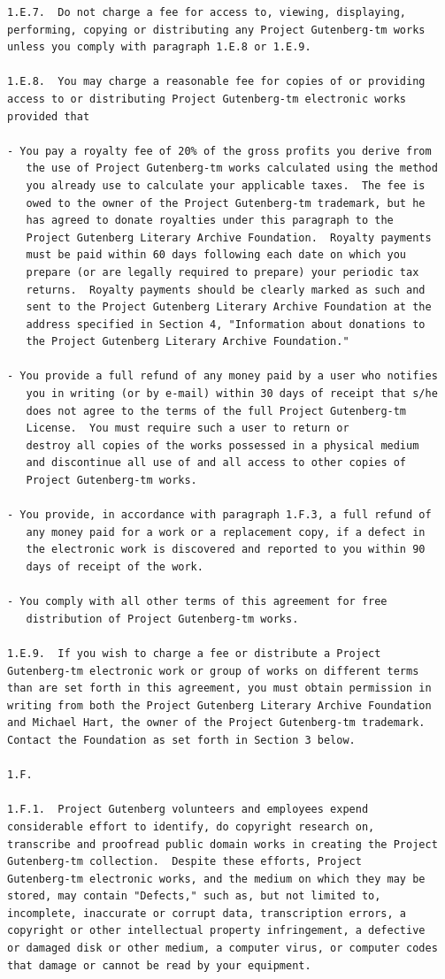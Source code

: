 \documentclass{book}[2004/02/16]
\begin{document}
\begin{verbatim}
1.E.7.  Do not charge a fee for access to, viewing, displaying,
performing, copying or distributing any Project Gutenberg-tm works
unless you comply with paragraph 1.E.8 or 1.E.9.

1.E.8.  You may charge a reasonable fee for copies of or providing
access to or distributing Project Gutenberg-tm electronic works
provided that

- You pay a royalty fee of 20% of the gross profits you derive from
   the use of Project Gutenberg-tm works calculated using the method
   you already use to calculate your applicable taxes.  The fee is
   owed to the owner of the Project Gutenberg-tm trademark, but he
   has agreed to donate royalties under this paragraph to the
   Project Gutenberg Literary Archive Foundation.  Royalty payments
   must be paid within 60 days following each date on which you
   prepare (or are legally required to prepare) your periodic tax
   returns.  Royalty payments should be clearly marked as such and
   sent to the Project Gutenberg Literary Archive Foundation at the
   address specified in Section 4, "Information about donations to
   the Project Gutenberg Literary Archive Foundation."

- You provide a full refund of any money paid by a user who notifies
   you in writing (or by e-mail) within 30 days of receipt that s/he
   does not agree to the terms of the full Project Gutenberg-tm
   License.  You must require such a user to return or
   destroy all copies of the works possessed in a physical medium
   and discontinue all use of and all access to other copies of
   Project Gutenberg-tm works.

- You provide, in accordance with paragraph 1.F.3, a full refund of
   any money paid for a work or a replacement copy, if a defect in
   the electronic work is discovered and reported to you within 90
   days of receipt of the work.

- You comply with all other terms of this agreement for free
   distribution of Project Gutenberg-tm works.

1.E.9.  If you wish to charge a fee or distribute a Project
Gutenberg-tm electronic work or group of works on different terms
than are set forth in this agreement, you must obtain permission in
writing from both the Project Gutenberg Literary Archive Foundation
and Michael Hart, the owner of the Project Gutenberg-tm trademark.
Contact the Foundation as set forth in Section 3 below.

1.F.

1.F.1.  Project Gutenberg volunteers and employees expend
considerable effort to identify, do copyright research on,
transcribe and proofread public domain works in creating the Project
Gutenberg-tm collection.  Despite these efforts, Project
Gutenberg-tm electronic works, and the medium on which they may be
stored, may contain "Defects," such as, but not limited to,
incomplete, inaccurate or corrupt data, transcription errors, a
copyright or other intellectual property infringement, a defective
or damaged disk or other medium, a computer virus, or computer codes
that damage or cannot be read by your equipment.


\end{verbatim}
\end{document}
